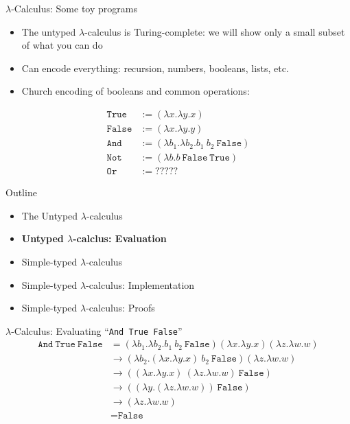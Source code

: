\documentclass[leqno,presentation,usenames,dvipsnames]{beamer}
\begin{document}
\begin{frame}{$\lambda$-Calculus: Some toy programs}
    \begin{itemize}
        \item The untyped $\lambda$-calculus is Turing-complete: we will show only a small subset of what you can do
        \item Can encode everything: recursion, numbers, booleans, lists, etc.
        \item Church encoding of booleans and common operations:
    \end{itemize}
\begin{align*}
    \texttt{True} & := (\lambda x. \lambda y. x) \\
    \texttt{False} & := (\lambda x. \lambda y. y) \\
    \texttt{And} & := (\lambda b_1. \lambda b_2. b_1~b_2~\texttt{False}) \\
    \texttt{Not} & := (\lambda b. b~\texttt{False}~\texttt{True}) \\
    \texttt{Or} & := ?????
\end{align*}
\end{frame}

\begin{frame}{Outline}
    \begin{itemize}
        \item The Untyped $\lambda$-calculus
        \item \textbf{Untyped $\lambda$-calclus: Evaluation}
        \item Simple-typed $\lambda$-calculus
        \item Simple-typed $\lambda$-calculus: Implementation
        \item Simple-typed $\lambda$-calculus: Proofs
    \end{itemize}
\end{frame}

\begin{frame}{$\lambda$-Calculus: Evaluating ``\texttt{And True False}''}
\begin{align*}
    \texttt{And}~\texttt{True}~\texttt{False} & = (\lambda b_1. \lambda b_2. b_1~b_2~\texttt{False}) (\lambda x. \lambda y. x) (\lambda z. \lambda w. w) \\
                                        & \to (\lambda b_2. (\lambda x. \lambda y. x)~b_2~\texttt{False}) (\lambda z. \lambda w. w) \\
                                        & \to ((\lambda x. \lambda y. x)~(\lambda z. \lambda w. w)~\texttt{False}) \\
                                        & \to ((\lambda y. (\lambda z. \lambda w. w))~\texttt{False}) \\
                                        & \to (\lambda z. \lambda w. w) \\
                                        & = \texttt{False}
\end{align*}
\end{frame}
\end{document}
